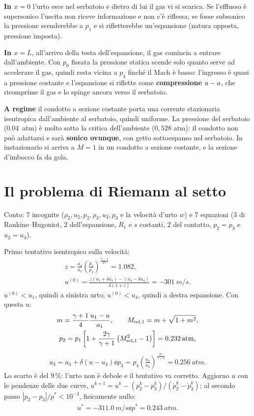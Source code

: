 \textbf{In $x=0$} l'urto esce nel serbatoio e dietro di lui il gas vi si scarica. Se l'efflusso è supersonico l'uscita non
riceve informazione e non c'è riflessa; se fosse subsonico la pressione scenderebbe a $p_1$ e si rifletterebbe
un'espansione (natura opposta, pressione imposta).

\textbf{In $x=L$}, all'arrivo della testa dell'espansione, il gas comincia a entrare dall'ambiente. Con $p_0$ fissata la
pressione statica scende solo quanto serve ad accelerare il gas, quindi resta vicina a $p_4$ finché il Mach è basso:
l'ingresso è quasi a pressione costante e l'espansione si riflette come \textbf{compressione $u-a$}, che ricomprime il gas
e lo spinge ancora verso il serbatoio.

\textbf{A regime} il condotto a sezione costante porta una corrente stazionaria isentropica dall'ambiente al serbatoio,
quindi uniforme. La pressione del serbatoio (\SI{0.04}{atm}) è molto sotto la critica dell'ambiente ($0{,}528$ atm):
il condotto non può adattarsi e sarà \textbf{sonico ovunque}, con getto sottoespanso nel serbatoio. In instazionario si
arriva a $M=1$ in un condotto a sezione costante, e la sezione d'imbocco fa da gola.

\section*{Il problema di Riemann al setto}
Conto: 7 incognite ($\rho_2,u_2,p_2,\rho_3,u_3,p_3$ e la velocità d'urto $w$) e 7 equazioni (3 di Rankine--Hugoniot, 2
dell'espansione, $R_1$ e $s$ costanti, 2 del contatto, $p_2=p_3$ e $u_2=u_3$).

Primo tentativo isentropico sulla velocità:
\begin{gather*}
  z=\frac{a_4}{a_1}\left(\frac{p_1}{p_4}\right)^{\frac{\gamma-1}{2\gamma}}=\num{1.082},\\
  u^{(0)}=\frac{z(a_1+\delta u_1)-(a_4-\delta u_4)}{\delta(1+z)}=\SI{-301}{m/s}.
\end{gather*}
$u^{(0)}<u_1$, quindi a sinistra urto; $u^{(0)}<u_4$, quindi a destra espansione. Con questa $u$:
\begin{gather*}
  m=\frac{\gamma+1}{4}\frac{u_1-u}{a_1} ,\qquad M_{\rm rel,1}=m+\sqrt{1+m^2},\\
  p_2=p_1\left[1+\frac{2\gamma}{\gamma+1}\left(M_{\rm rel,1}^2-1\right)\right]=\SI{0.232}{atm},
\end{gather*}
\begin{gather*}
  a_3=a_4+\delta(u-u_4) \ee p_3=p_4\left(\frac{a_3}{a_4}\right)^{\frac{2\gamma}{\gamma-1}}=\SI{0.256}{atm}.
\end{gather*}
Lo scarto è del 9\,\%: l'urto non è debole e il tentativo va corretto. Aggiorno $u$ con le pendenze delle due curve,
$u^{k+1}=u^k-(p_2^k-p_3^k)/(\dot p_2^k-\dot p_3^k)$; al secondo passo $|p_2-p_3|/p^*<10^{-3}$, fisicamente nullo:
\begin{gather*}
  u^*=\SI{-311.0}{m/s} \ee p^*=\SI{0.243}{atm}.
\end{gather*}

